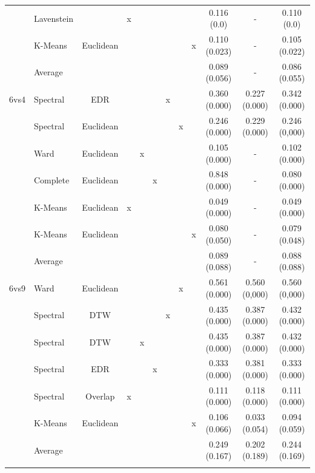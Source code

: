\documentclass[12pt,a4paper,bibliography=totocnumbered,listof=totocnumbered]{scrartcl}
\begin{document}
{\begin{appendix}
\begin{table}[!htbp]
\begin{tabular}{@{\extracolsep{0pt}} llcccccccccc}
		& Lavenstein &  & x &  &  &  &  &  & 0.116 (0.0) & - & 0.110 (0.0) \\ 
		& K-Means & Euclidean &  &  &  &  &  & x & 0.110 (0.023) & - & 0.105 (0.022) \\ 
		& Average &  &  &  &  &  &  &  & 0.089 (0.056) & - & 0.086 (0.055) \\ 
		6vs4 & Spectral & EDR &  &  &  & x &  &  & 0.360 (0.000) & 0.227 (0.000) & 0.342 (0.000) \\ 
		& Spectral & Euclidean  &  &  &  &  & x &  & 0.246 (0.000) & 0.229 (0.000) & 0.246 (0,000) \\ 
		& Ward & Euclidean  &  & x &  &  &  &  & 0.105 (0.000) & - & 0.102 (0.000) \\ 
		& Complete & Euclidean  &  &  & x &  &  &  & 0.848 (0.000) & - & 0.080 (0.000) \\ 
		& K-Means & Euclidean  & x &  &  &  &  &  & 0.049 (0.000) & - & 0.049 (0.000) \\ 
		& K-Means & Euclidean  &  &  &  &  &  & x & 0.080 (0.050) & - & 0.079 (0.048) \\ 
		& Average &  &  &  &  &  &  &  & 0.089 (0.088) & - & 0.088 (0.088) \\ 
		6vs9 & Ward  & Euclidean &  &  &  &  & x &  & 0.561 (0.000) & 0.560 (0,000) & 0.560 (0,000) \\ 
		& Spectral & DTW &  &  &  & x &  &  & 0.435 (0.000) & 0.387 (0.000) & 0.432 (0.000) \\ 
		& Spectral & DTW &  & x &  &  &  &  & 0.435 (0.000) & 0.387 (0.000) & 0.432 (0.000) \\ 
		& Spectral & EDR &  &  & x &  &  &  & 0.333 (0.000) & 0.381 (0.000) & 0.333 (0.000) \\ 
		& Spectral & Overlap & x &  &  &  &  &  & 0.111 (0.000) & 0.118 (0.000) & 0.111 (0.000) \\ 
		& K-Means & Euclidean &  &  &  &  &  & x & 0.106 (0.066) & 0.033 (0.054) & 0.094 (0.059) \\ 
		& Average &  &  &  &  &  &  &  & 0.249 (0.167) & 0.202 (0.189) & 0.244 (0.169) \\ 
		\hline \\[-1.8ex] 
	\end{tabular} 
\end{table} 


\end{appendix}}
\end{document}
